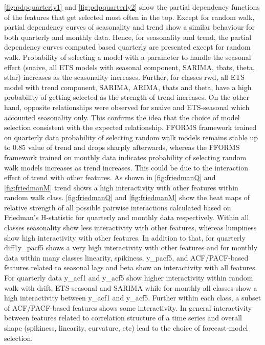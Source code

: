 \documentclass[11pt,a4paper,]{article}
\begin{document}
\autoref{fig:pdpquarterly1} and \autoref{fig:pdpquarterly2} show the
partial dependency functions of the features that get selected most
often in the top. Except for random walk, partial dependency curves of
seasonality and trend show a similar behaviour for both quarterly and
monthly data. Hence, for seasonality and trend, the partial dependency
curves computed based quarterly are presented except for random walk.
Probability of selecting a model with a parameter to handle the seasonal
effect (snaive, all ETS models with seasonal component, SARIMA, tbats,
theta, stlar) increases as the seasonality increases. Further, for
classes rwd, all ETS model with trend component, SARIMA, ARIMA, tbats
and theta, have a high probability of getting selected as the strength
of trend increases. On the other hand, opposite relationships were
observed for snaive and ETS-seasonal which accounted seasonality only.
This confirms the idea that the choice of model selection consistent
with the expected relationship. FFORMS framework trained on quarterly
data probability of selecting random walk models remains stable up to
0.85 value of trend and drops sharply afterwards, whereas the FFORMS
framework trained on monthly data indicates probability of selecting
random walk models increases as trend increases. This could be due to
the interaction effect of trend with other features. As shown in
\autoref{fig:friedmanQ} and \autoref{fig:friedmanM} trend shows a high
interactivity with other features within random walk class.
\autoref{fig:friedmanQ} and \autoref{fig:friedmanM} show the heat maps
of relative strength of all possible pairwise interactions calculated
based on Friedman's H-statistic for quarterly and monthly data
respectively. Within all classes seasonality show less interactivity
with other features, whereas lumpiness show high interactivity with
other features. In addition to that, for quarterly diff1y\_pacf5 shows a
very high interactivity with other features and for monthly data within
many classes linearity, spikiness, y\_pacf5, and ACF/PACF-based features
related to seasonal lags and beta show an interactivity with all
features. For quarterly data y\_acf1 and y\_acf5 show higher
interactivity within random walk with drift, ETS-seasonal and SARIMA
while for monthly all classes show a high interactivity between y\_acf1
and y\_acf5. Further within each class, a subset of ACF/PACF-based
features shows some interactivity. In general interactivity between
features related to correlation structure of a time series and overall
shape (spikiness, linearity, curvature, etc) lead to the choice of
forecast-model selection.
\end{document}
